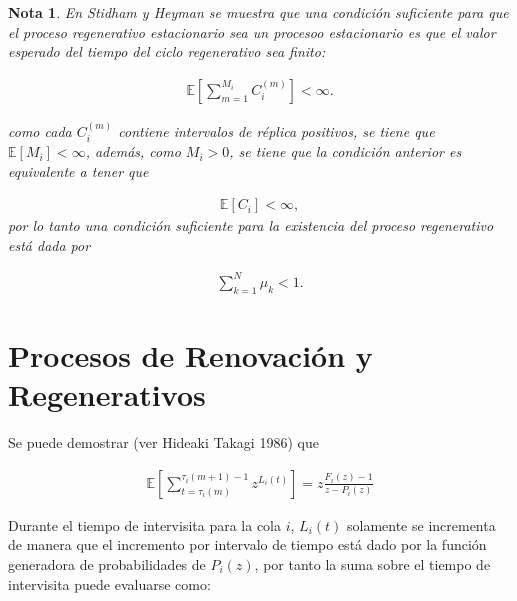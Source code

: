 \documentclass{article}
\newtheorem{Note}{Nota}
\newcommand{\esp}{\mathbb{E}}
\begin{document}
\begin{Note}\label{Cita1.Stidham}
En Stidham\cite{Stidham} y Heyman  se muestra que una condici\'on suficiente para que el proceso regenerativo 
estacionario sea un procesoo estacionario es que el valor esperado del tiempo del ciclo regenerativo sea finito:

\begin{eqnarray*}
\esp\left[\sum_{m=1}^{M_{i}}C_{i}^{(m)}\right]<\infty.
\end{eqnarray*}

como cada $C_{i}^{(m)}$ contiene intervalos de r\'eplica positivos, se tiene que $\esp\left[M_{i}\right]<\infty$, adem\'as, como $M_{i}>0$, se tiene que la condici\'on anterior es equivalente a tener que 

\begin{eqnarray*}
\esp\left[C_{i}\right]<\infty,
\end{eqnarray*}
por lo tanto una condici\'on suficiente para la existencia del proceso regenerativo est\'a dada por

\begin{eqnarray*}
\sum_{k=1}^{N}\mu_{k}<1.
\end{eqnarray*}

{}
\end{Note}


\section{Procesos de Renovaci\'on y Regenerativos}



Se puede demostrar (ver Hideaki Takagi 1986) que

\begin{eqnarray*}
\esp\left[\sum_{t=\tau_{i}\left(m\right)}^{\tau_{i}\left(m+1\right)-1}z^{L_{i}\left(t\right)}\right]=z\frac{F_{i}\left(z\right)-1}{z-P_{i}\left(z\right)}
\end{eqnarray*}

Durante el tiempo de intervisita para la cola $i$, $L_{i}\left(t\right)$ solamente se incrementa de manera que el incremento por intervalo de tiempo est\'a dado por la funci\'on generadora de probabilidades de $P_{i}\left(z\right)$, por tanto la suma sobre el tiempo de intervisita puede evaluarse como:
\end{document}
